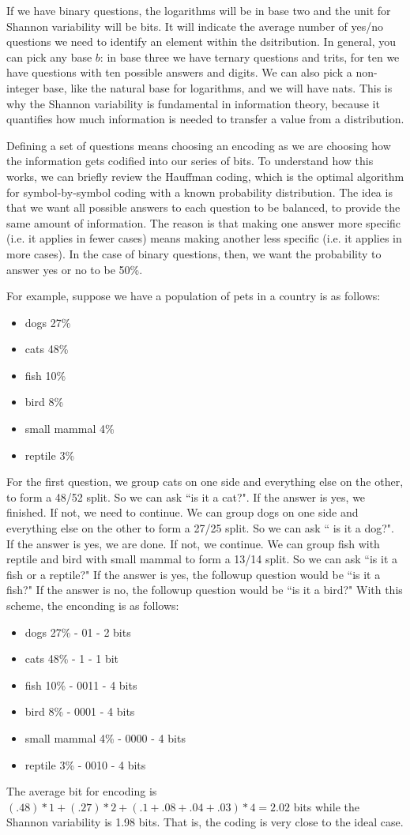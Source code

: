 \documentclass{article}
\begin{document}
If we have binary questions, the logarithms will be in base two and the unit for Shannon variability will be bits. It will indicate the average number of yes/no questions we need to identify an element within the dsitribution. In general, you can pick any base $b$: in base three we have ternary questions and trits, for ten we have questions with ten possible answers and digits. We can also pick a non-integer base, like the natural base for logarithms, and we will have nats. This is why the Shannon variability is fundamental in information theory, because it quantifies how much information is needed to transfer a value from a distribution.

Defining a set of questions means choosing an encoding as we are choosing how the information gets codified into our series of bits. To understand how this works, we can briefly review the Hauffman coding, which is the optimal algorithm for symbol-by-symbol coding with a known probability distribution. The idea is that we want all possible answers to each question to be balanced, to provide the same amount of information. The reason is that making one answer more specific (i.e. it applies in fewer cases) means making another less specific (i.e. it applies in more cases). In the case of binary questions, then, we want the probability to answer yes or no to be 50\%.

For example, suppose we have a population of pets in a country is as follows:
\begin{itemize}
\item dogs 27\%
\item cats 48\%
\item fish 10\%
\item bird 8\%
\item small mammal 4\%
\item reptile 3\%
\end{itemize}
For the first question, we group cats on one side and everything else on the other, to form a 48/52 split. So we can ask ``is it a cat?". If the answer is yes, we finished. If not, we need to continue. We can group dogs on one side and everything else on the other to form a 27/25 split. So we can ask `` is it a dog?". If the answer is yes, we are done. If not, we continue. We can group fish with reptile and bird with small mammal to form a 13/14 split. So we can ask ``is it a fish or a reptile?" If the answer is yes, the followup question would be ``is it a fish?" If the answer is no, the followup question would be ``is it a bird?" With this scheme, the enconding is as follows:
\begin{itemize}
\item dogs 27\% - 01 - 2 bits
\item cats 48\% - 1 - 1 bit
\item fish 10\% - 0011 - 4 bits
\item bird 8\% - 0001 - 4 bits
\item small mammal 4\% - 0000 - 4 bits
\item reptile 3\% - 0010 - 4 bits
\end{itemize}
The average bit for encoding is $(.48) * 1 + (.27) * 2 + (.1 + .08 + .04 + .03) * 4 = 2.02$ bits while the Shannon variability is 1.98 bits. That is, the coding is very close to the ideal case.
\end{document}
